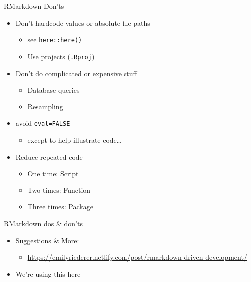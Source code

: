 \documentclass[
  ignorenonframetext,
]{beamer}
\providecommand{\tightlist}{%
  \setlength{\itemsep}{0pt}\setlength{\parskip}{0pt}}
\begin{document}
\begin{frame}[fragile]{RMarkdown Don'ts}
\protect\hypertarget{rmarkdown-donts}{}

\begin{itemize}
\tightlist
\item
  Don't hardcode values or absolute file paths

  \begin{itemize}
  \tightlist
  \item
    see \texttt{here::here()}
  \item
    Use projects (\texttt{.Rproj})
  \end{itemize}
\item
  Don't do complicated or expensive stuff

  \begin{itemize}
  \tightlist
  \item
    Database queries
  \item
    Resampling
  \end{itemize}
\item
  avoid \texttt{eval=FALSE}

  \begin{itemize}
  \tightlist
  \item
    except to help illustrate code\ldots{}
  \end{itemize}
\item
  Reduce repeated code

  \begin{itemize}
  \tightlist
  \item
    One time: Script
  \item
    Two times: Function
  \item
    Three times: Package
  \end{itemize}
\end{itemize}

\end{frame}

\begin{frame}{RMarkdown dos \& don'ts}
\protect\hypertarget{rmarkdown-dos-donts}{}

\begin{itemize}
\tightlist
\item
  Suggestions \& More:

  \begin{itemize}
  \tightlist
  \item
    \url{https://emilyriederer.netlify.com/post/rmarkdown-driven-development/}
  \end{itemize}
\item
  We're using this here
\end{itemize}

\end{frame}
\end{document}
